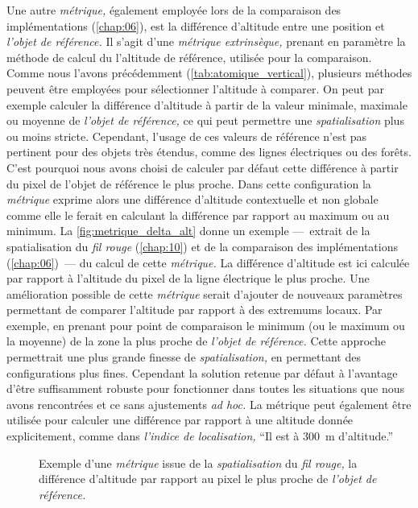 Une autre \emph{métrique,} également employée lors de la comparaison
des implémentations (\autoref{chap:06}), est la différence d'altitude
entre une position et \emph{l'objet de référence.} Il s'agit d'une
\emph{métrique extrinsèque,} prenant en paramètre la méthode de calcul
du l'altitude de référence, utilisée pour la comparaison. Comme nous
l'avons précédemment (\autoref{tab:atomique_vertical}), plusieurs
méthodes peuvent être employées pour sélectionner l'altitude à
comparer. On peut par exemple calculer la différence d'altitude à
partir de la valeur minimale, maximale ou moyenne de \emph{l'objet de
  référence,} ce qui peut permettre une \emph{spatialisation} plus ou
moins stricte. Cependant, l'usage de ces valeurs de référence n'est
pas pertinent pour des objets très étendus, comme des lignes
électriques ou des forêts. C'est pourquoi nous avons choisi de
calculer par défaut cette différence à partir du pixel de l'objet de
référence le plus proche. Dans cette configuration la \emph{métrique}
 exprime alors une différence d'altitude contextuelle
et non globale comme elle le ferait en calculant la différence par
rapport au maximum ou au minimum. La \autoref{fig:metrique_delta_alt}
donne un exemple ---~extrait de la spatialisation du \emph{fil rouge}
(\autoref{chap:10}) et de la comparaison des implémentations
(\autoref{chap:06})~--- du calcul de cette \emph{métrique.} La
différence d'altitude est ici calculée par rapport à l'altitude du
pixel de la ligne électrique le plus proche. Une amélioration possible
de cette \emph{métrique} serait d'ajouter de nouveaux paramètres
permettant de comparer l'altitude par rapport à des extremums
locaux. Par exemple, en prenant pour point de comparaison le minimum
(ou le maximum ou la moyenne) de la zone la plus proche de
\emph{l'objet de référence.} Cette approche permettrait une plus
grande finesse de \emph{spatialisation,} en permettant des
configurations plus fines. Cependant la solution retenue par défaut à
l'avantage d'être suffisamment robuste pour fonctionner dans toutes
les situations que nous avons rencontrées et ce sans ajustements
\emph{ad hoc.} La métrique  peut également être
utilisée pour calculer une différence par rapport à une altitude
donnée explicitement, comme dans \emph{l'indice de localisation,}
\enquote{Il est à \SI{300}{\meter} d'altitude.}

\begin{figure}
  \centering
  
  \caption{Exemple d'une \emph{métrique} issue de la
    \emph{spatialisation} du \emph{fil rouge,} la différence
    d'altitude par rapport au pixel le plus proche de \emph{l'objet de
      référence.}}
  \label{fig:metrique_delta_alt}
\end{figure}

